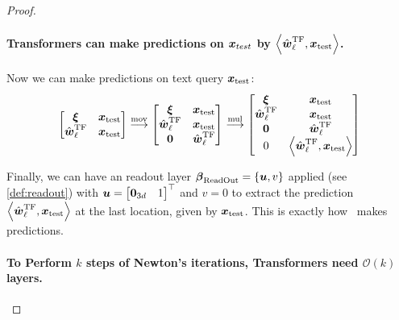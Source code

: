\begin{proof}
\paragraph{Transformers can make predictions on $\boldsymbol{x}_{test}$ by $\left\langle {\hat{\boldsymbol{w}}_\ell^\mathrm{TF}, \boldsymbol{x}_\mathrm{test}} \right\rangle$.} 

Now we can make predictions on text query $\boldsymbol{x}_\mathrm{test}$:
\begin{equation}
    \begin{bmatrix}
        \boldsymbol{\xi} &  \boldsymbol{x}_\mathrm{test} \\
        \hat{\boldsymbol{w}}_\ell^\mathrm{TF} & \boldsymbol{x}_\mathrm{test}
    \end{bmatrix} \overset{\mathrm{mov}}{\longrightarrow} \begin{bmatrix}
        \boldsymbol{\xi} &  \boldsymbol{x}_\mathrm{test} \\
        \hat{\boldsymbol{w}}_\ell^\mathrm{TF} & \boldsymbol{x}_\mathrm{test} \\
        \boldsymbol{0} & \hat{\boldsymbol{w}}_\ell^\mathrm{TF}
    \end{bmatrix} \overset{\mathrm{mul}}{\longrightarrow} \begin{bmatrix}
        \boldsymbol{\xi} &  \boldsymbol{x}_\mathrm{test} \\
        \hat{\boldsymbol{w}}_\ell^\mathrm{TF} & \boldsymbol{x}_\mathrm{test} \\
        \boldsymbol{0} & \hat{\boldsymbol{w}}_\ell^\mathrm{TF} \\
        0 & \left\langle {\hat{\boldsymbol{w}}_\ell^\mathrm{TF}, \boldsymbol{x}_\mathrm{test}} \right\rangle
    \end{bmatrix}
\end{equation}

Finally, we can have an readout layer $\boldsymbol{\beta}_\mathrm{ReadOut} = \{\boldsymbol{u}, v\}$ applied (see \cref{def:readout}) with $\boldsymbol{u} = \begin{bmatrix}
    \boldsymbol{0}_{3d} & 1 
\end{bmatrix}^\top$ and $v = 0$ to extract the prediction $ \left\langle {\hat{\boldsymbol{w}}_\ell^\mathrm{TF}, \boldsymbol{x}_\mathrm{test}} \right\rangle$ at the last location, given by $\boldsymbol{x}_\mathrm{test}$. This is exactly how \newton\ makes predictions. 

\paragraph{To Perform $k$ steps of Newton's iterations, Transformers need $\mathcal O(k)$ layers.}


\end{proof}
